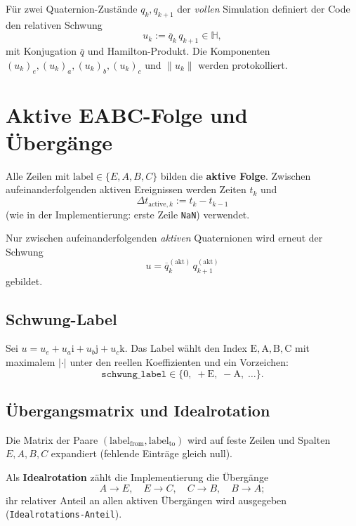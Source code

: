 \documentclass[11pt,a4paper]{article}
\begin{document}
Für zwei Quaternion-Zustände $q_k,q_{k+1}$ der \emph{vollen} Simulation definiert der Code
den relativen Schwung
\begin{equation}
  u_k := \overline{q}_k\, q_{k+1} \in \mathbb{H},
\end{equation}
mit Konjugation $\overline{q}$ und Hamilton-Produkt. Die Komponenten $(u_k)_e,(u_k)_a,(u_k)_b,(u_k)_c$
und $\|u_k\|$ werden protokolliert.

\section{Aktive EABC-Folge und Übergänge}

Alle Zeilen mit $\mathrm{label}\in\{E,A,B,C\}$ bilden die \textbf{aktive Folge}.
Zwischen aufeinanderfolgenden aktiven Ereignissen werden Zeiten $t_k$ und
\begin{equation}
  \Delta t_{\mathrm{active},k} := t_k - t_{k-1}
\end{equation}
(wie in der Implementierung: erste Zeile \texttt{NaN}) verwendet.

Nur zwischen aufeinanderfolgenden \emph{aktiven} Quaternionen wird erneut der Schwung
\begin{equation}
  u = \overline{q}^{(\mathrm{akt})}_{k}\, q^{(\mathrm{akt})}_{k+1}
\end{equation}
gebildet.

\subsection{Schwung-Label}

Sei $u = u_e + u_a\mathrm{i}+ u_b\mathrm{j}+ u_c\mathrm{k}$.
Das Label wählt den Index $\mathrm{E},\mathrm{A},\mathrm{B},\mathrm{C}$ mit maximalem
$|\cdot|$ unter den reellen Koeffizienten und ein Vorzeichen:
\begin{equation}
  \texttt{schwung\_label} \in \{0,\;+\mathrm{E},\;-\mathrm{A},\;\ldots\}.
\end{equation}

\subsection{Übergangsmatrix und Idealrotation}

Die Matrix der Paare $(\mathrm{label}_{\mathrm{from}},\mathrm{label}_{\mathrm{to}})$
wird auf feste Zeilen und Spalten $E,A,B,C$ expandiert (fehlende Einträge gleich null).

Als \textbf{Idealrotation} zählt die Implementierung die Übergänge
\begin{equation}
  A\!\to\! E,\quad E\!\to\! C,\quad C\!\to\! B,\quad B\!\to\! A;
\end{equation}
ihr relativer Anteil an allen aktiven Übergängen wird ausgegeben (\texttt{Idealrotations-Anteil}).
\end{document}
